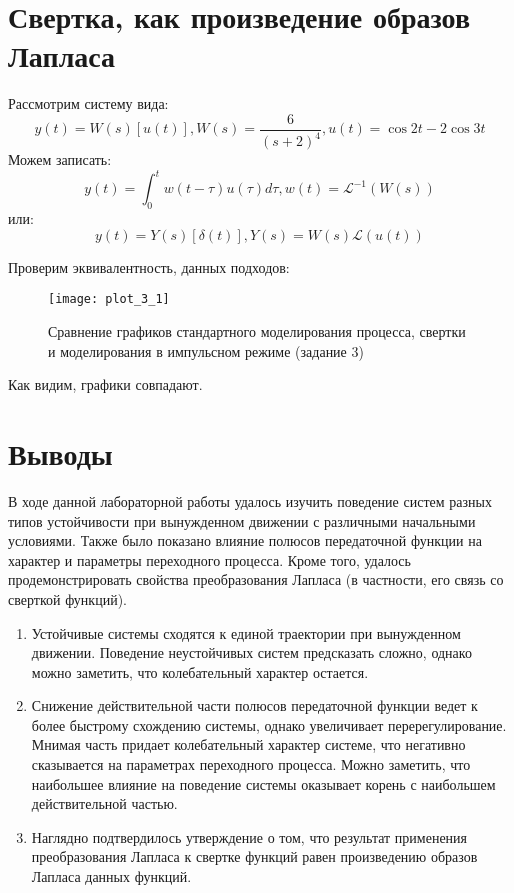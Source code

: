 \section{Свертка, как произведение образов Лапласа}

Рассмотрим систему вида:
\begin{equation}
    y(t) = W(s)[u(t)],
    W(s) = \frac{6}{(s+2)^4}, u(t)=\cos{2t} - 2\cos{3t}
\end{equation}
Можем записать:
\begin{equation*}
    y(t) = \int_{0}^{t}w(t - \tau)u(\tau)d\tau, w(t) = \mathcal{L}^{-1}(W(s))
\end{equation*}
или:
\begin{equation*}
    y(t) = Y(s)[\delta(t)], Y(s)=W(s)\mathcal{L}(u(t))
\end{equation*}

Проверим эквивалентность, данных подходов:
\begin{figure}[h]
    \centering
    \texttt{[image: plot\_3\_1]}
    \caption{\label{fig:The-caption-1} Сравнение графиков стандартного моделирования процесса, свертки и моделирования в импульсном режиме (задание 3)}
\end{figure}

Как видим, графики совпадают.

\pagebreak

\section{Выводы}
В ходе данной лабораторной работы удалось изучить поведение систем разных типов устойчивости при 
вынужденном движении с различными начальными условиями. Также было показано влияние полюсов передаточной функции
на характер и параметры переходного процесса. Кроме того, удалось продемонстрировать свойства преобразования Лапласа
 (в частности, его связь со сверткой функций).
\begin{enumerate}
    \item Устойчивые системы сходятся к единой траектории при вынужденном движении. Поведение неустойчивых систем предсказать сложно,
 однако можно заметить, что колебательный характер остается.
    \item  Снижение действительной части полюсов передаточной функции ведет к более быстрому
 схождению системы, однако увеличивает перерегулирование. Мнимая часть придает колебательный характер системе,
 что негативно сказывается на параметрах переходного процесса. Можно заметить, что наибольшее влияние на поведение
 системы оказывает корень с наибольшем действительной частью.
    \item Наглядно подтвердилось утверждение о том, что результат применения преобразования Лапласа к свертке функций 
 равен произведению образов Лапласа данных функций.
\end{enumerate}
\pagebreak
